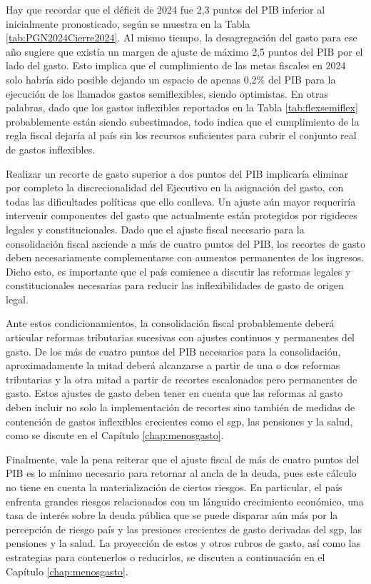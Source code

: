 Hay que recordar que el déficit de 2024 fue 2,3 puntos del PIB inferior al inicialmente pronosticado, según se muestra en la Tabla \ref{tab:PGN2024Cierre2024}. Al mismo tiempo, la desagregación del gasto para ese año sugiere que existía un margen de ajuste de máximo 2,5 puntos del PIB por el lado del gasto. Esto implica que el cumplimiento de las metas fiscales en 2024 solo habría sido posible dejando un espacio de apenas 0,2\% del PIB para la ejecución de los llamados gastos semiflexibles, siendo optimistas. En otras palabras, dado que los gastos inflexibles reportados en la Tabla \ref{tab:flexsemiflex} probablemente están siendo subestimados, todo indica que el cumplimiento de la regla fiscal dejaría al país sin los recursos suficientes para cubrir el conjunto real de gastos inflexibles.

Realizar un recorte de gasto superior a dos puntos del PIB implicaría eliminar por completo la discrecionalidad del Ejecutivo en la asignación del gasto, con todas las dificultades políticas que ello conlleva. Un ajuste aún mayor requeriría intervenir componentes del gasto que actualmente están protegidos por rigideces legales y constitucionales. Dado que el ajuste fiscal necesario para la consolidación fiscal asciende a más de cuatro puntos del PIB, los recortes de gasto deben necesariamente complementarse con aumentos permanentes de los ingresos. Dicho esto, es importante que el país comience a discutir las reformas legales y constitucionales necesarias para reducir las inflexibilidades de gasto de origen legal.

Ante estos condicionamientos, la consolidación fiscal probablemente deberá articular reformas tributarias sucesivas con ajustes continuos y permanentes del gasto. De los más de cuatro puntos del PIB necesarios para la consolidación, aproximadamente la mitad deberá alcanzarse a partir de una o dos reformas tributarias y la otra mitad a partir de recortes escalonados pero permanentes de gasto. Estos ajustes de gasto deben tener en cuenta que las reformas al gasto deben incluir no solo la implementación de recortes sino también de medidas de contención de gastos inflexibles crecientes como el \gls{sgp}, las pensiones y la salud, como se discute en el Capítulo \ref{chap:menosgasto}.  

Finalmente, vale la pena reiterar que el ajuste fiscal de más de cuatro puntos del PIB es lo mínimo necesario para retornar al ancla de la deuda, pues este cálculo no tiene en cuenta la materialización de ciertos riesgos. En particular, el país enfrenta grandes riesgos relacionados con un lánguido crecimiento económico, una tasa de interés sobre la deuda pública que se puede disparar aún más por la percepción de riesgo país y las presiones crecientes de gasto derivadas del \gls{sgp}, las pensiones y la salud. La proyección de estos y otros rubros de gasto, así como las estrategias para contenerlos o reducirlos, se discuten a continuación en el Capítulo \ref{chap:menosgasto}.


